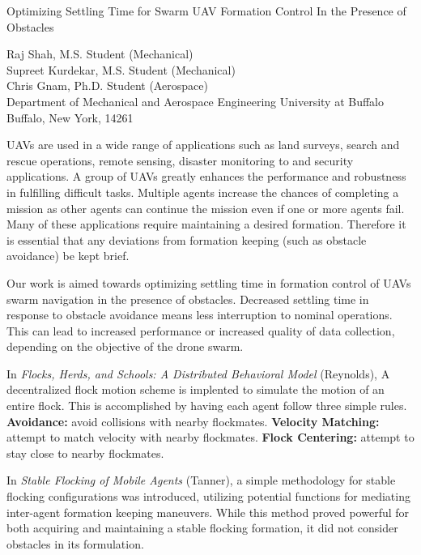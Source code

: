 \documentclass[11pt]{article}
\begin{document}
\begin{center}
{\footnotesize{\hvb
Optimizing Settling Time for Swarm UAV Formation Control In the Presence of Obstacles\\
}}

\vspace{10pt}
{\footnotesize
{\hvb Raj Shah}, {\hv M.S. Student (Mechanical)} \\
{\hvb Supreet Kurdekar}, {\hv M.S. Student (Mechanical)}\\
{\hvb Chris Gnam}, {\hv Ph.D. Student (Aerospace)} \\
{\hv
Department of Mechanical and Aerospace Engineering
University at Buffalo
Buffalo, New York, 14261
}}
\end{center}
UAVs are used in a wide range of applications such as land surveys, search and rescue operations, remote sensing, disaster monitoring to and security applications. A group of UAVs greatly enhances the performance and robustness in fulfilling difficult tasks.  Multiple agents increase the chances of completing a mission as other agents can continue the mission even if one or more agents fail.  Many of these applications require maintaining a desired formation.  Therefore it is essential that any deviations from formation keeping (such as obstacle avoidance) be kept brief.  

Our work is aimed towards optimizing settling time in formation control of UAVs swarm navigation in the presence of obstacles.  Decreased settling time in response to obstacle avoidance means less interruption to nominal operations.  This can lead to increased performance or increased quality of data collection, depending on the objective of the drone swarm. 

In \textit{Flocks, Herds, and Schools: A Distributed Behavioral Model } (Reynolds), A decentralized flock motion scheme is implented to simulate the motion of an entire flock.  This is accomplished by having each agent follow three simple rules.  \textbf{Avoidance:} avoid collisions with nearby flockmates.  \textbf{Velocity Matching:} attempt to match velocity with nearby flockmates.  \textbf{Flock Centering:} attempt to stay close to nearby flockmates.

In \textit{Stable Flocking of Mobile Agents} (Tanner), a simple methodology for stable flocking configurations was introduced, utilizing potential functions for mediating inter-agent formation keeping maneuvers.  While this method proved powerful for both acquiring and maintaining a stable flocking formation, it did not consider obstacles in its formulation.
\end{document}
